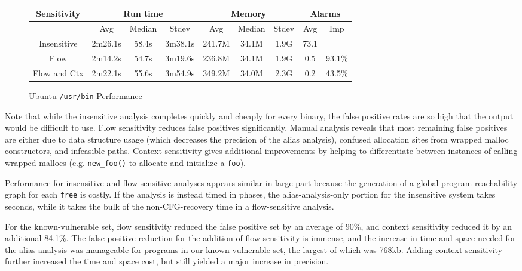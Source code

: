 \begin{figure*}
	\begin{center}
	\begin{tabular}{|c||c|c|c||c|c|c||c|c|}
		\hline
		Sensitivity & \multicolumn{3}{c||}{Run time} & \multicolumn{3}{c||}{Memory} & \multicolumn{2}{c|}{Alarms} \\
		\hline
		& Avg & Median & Stdev & Avg & Median & Stdev  &Avg & Imp\\
		\hline\hline
		Insensitive  & 2m26.1s & 58.4s & 3m38.1s & 241.7M & 34.1M & 1.9G & 73.1 &\\ \hline
		Flow & 2m14.2s & 54.7s & 3m19.6s & 236.8M & 34.1M & 1.9G & 0.5 & 93.1\% \\ \hline
		Flow and Ctx  & 2m22.1s & 55.6s & 3m54.9s & 349.2M & 34.0M & 2.3G & 0.2 & 43.5\% \\ \hline
	\end{tabular}
	\end{center}
	\caption{Ubuntu \texttt{/usr/bin} Performance}
	\label{fig:ubperf}
\end{figure*}

Note that while the insensitive analysis completes quickly and cheaply for every binary, the false positive rates are so high that the output would be difficult to use.
Flow sensitivity reduces false positives significantly.
Manual analysis reveals that most remaining false positives are either due to data structure usage (which decreases the precision of the alias analysis), confused allocation sites from wrapped malloc constructors, and infeasible paths.
Context sensitivity gives additional improvements by helping to differentiate between instances of calling wrapped mallocs (e.g. \texttt{new\_foo()} to allocate and initialize a \texttt{foo}).


Performance for insensitive and flow-sensitive analyses appears similar in large part because the generation of a global program reachability graph for each \texttt{free} is costly.
If the analysis is instead timed in phases, the alias-analysis-only portion for the insensitive system takes seconds, while it takes the bulk of the non-CFG-recovery time in a flow-sensitive analysis.

For the known-vulnerable set, flow sensitivity reduced the false positive set by an average of 90\%, and context sensitivity reduced it by an additional 84.1\%.
The false positive reduction for the addition of flow sensitivity is immense, and the increase in time and space needed for the alias analysis was manageable for programs in our known-vulnerable set, the largest of which was 768kb.
Adding context sensitivity further increased the time and space cost, but still yielded a major increase in precision.

